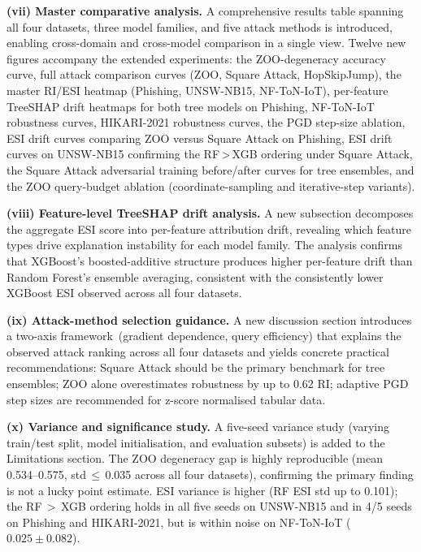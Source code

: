 \documentclass[12pt]{article}
\begin{document}
\textbf{(vii) Master comparative analysis.}
A comprehensive results table spanning all four datasets, three model families,
and five attack methods is introduced, enabling cross-domain and cross-model
comparison in a single view.  Twelve new figures accompany the extended experiments:
the ZOO-degeneracy accuracy curve, full attack comparison curves (ZOO, Square
Attack, HopSkipJump), the master RI/ESI heatmap (Phishing, UNSW-NB15, NF-ToN-IoT),
per-feature TreeSHAP drift heatmaps for both tree models on Phishing, NF-ToN-IoT
robustness curves, HIKARI-2021 robustness curves, the PGD step-size ablation, ESI
drift curves comparing ZOO versus Square Attack on Phishing, ESI drift curves on
UNSW-NB15 confirming the RF\,>\,XGB ordering under Square Attack,
the Square Attack adversarial training before/after curves for tree ensembles,
and the ZOO query-budget ablation (coordinate-sampling and iterative-step variants).

\textbf{(viii) Feature-level TreeSHAP drift analysis.}
A new subsection decomposes the aggregate ESI score into per-feature attribution
drift, revealing which feature types drive explanation instability for each model
family.  The analysis confirms that XGBoost's boosted-additive structure produces
higher per-feature drift than Random Forest's ensemble averaging, consistent with
the consistently lower XGBoost ESI observed across all four datasets.

\textbf{(ix) Attack-method selection guidance.}
A new discussion section introduces a two-axis framework~(gradient dependence,
query efficiency) that explains the observed attack ranking across all four
datasets and yields concrete practical recommendations: Square Attack should be
the primary benchmark for tree ensembles; ZOO alone overestimates robustness by
up to 0.62 RI; adaptive PGD step sizes are recommended for z-score normalised
tabular data.

\textbf{(x) Variance and significance study.}
A five-seed variance study (varying train/test split, model initialisation, and
evaluation subsets) is added to the Limitations section.  The ZOO degeneracy gap
is highly reproducible (mean 0.534--0.575, std\,$\leq$\,0.035 across all four
datasets), confirming the primary finding is not a lucky point estimate.  ESI
variance is higher (RF ESI std up to 0.101); the RF\,$>$\,XGB ordering holds in
all five seeds on UNSW-NB15 and in 4/5 seeds on Phishing and HIKARI-2021, but is
within noise on NF-ToN-IoT ($0.025 \pm 0.082$).
\end{document}
